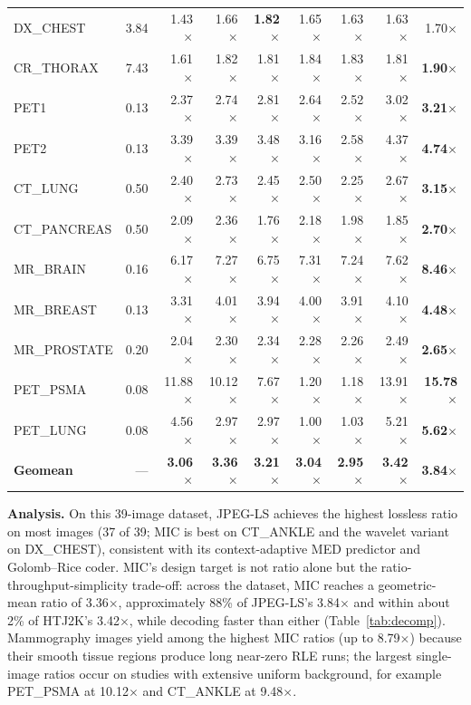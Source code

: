 \documentclass[journal]{IEEEtran}
\begin{document}
\begin{table}[t]
\begin{tabular}{lrrrrrrrr}
DX\_CHEST      & 3.84 & 1.43$\times$ & 1.66$\times$ & \textbf{1.82$\times$} & 1.65$\times$ & 1.63$\times$ & 1.63$\times$ & 1.70$\times$ \\
CR\_THORAX     & 7.43 & 1.61$\times$ & 1.82$\times$ & 1.81$\times$ & 1.84$\times$ & 1.83$\times$ & 1.81$\times$ & \textbf{1.90$\times$} \\
PET1           & 0.13 & 2.37$\times$ & 2.74$\times$ & 2.81$\times$ & 2.64$\times$ & 2.52$\times$ & 3.02$\times$ & \textbf{3.21$\times$} \\
PET2           & 0.13 & 3.39$\times$ & 3.39$\times$ & 3.48$\times$ & 3.16$\times$ & 2.58$\times$ & 4.37$\times$ & \textbf{4.74$\times$} \\
CT\_LUNG       & 0.50 & 2.40$\times$ & 2.73$\times$ & 2.45$\times$ & 2.50$\times$ & 2.25$\times$ & 2.67$\times$ & \textbf{3.15$\times$} \\
CT\_PANCREAS   & 0.50 & 2.09$\times$ & 2.36$\times$ & 1.76$\times$ & 2.18$\times$ & 1.98$\times$ & 1.85$\times$ & \textbf{2.70$\times$} \\
MR\_BRAIN      & 0.16 & 6.17$\times$ & 7.27$\times$ & 6.75$\times$ & 7.31$\times$ & 7.24$\times$ & 7.62$\times$ & \textbf{8.46$\times$} \\
MR\_BREAST     & 0.13 & 3.31$\times$ & 4.01$\times$ & 3.94$\times$ & 4.00$\times$ & 3.91$\times$ & 4.10$\times$ & \textbf{4.48$\times$} \\
MR\_PROSTATE   & 0.20 & 2.04$\times$ & 2.30$\times$ & 2.34$\times$ & 2.28$\times$ & 2.26$\times$ & 2.49$\times$ & \textbf{2.65$\times$} \\
PET\_PSMA      & 0.08 & 11.88$\times$ & 10.12$\times$ & 7.67$\times$ & 1.20$\times$ & 1.18$\times$ & 13.91$\times$ & \textbf{15.78$\times$} \\
PET\_LUNG      & 0.08 & 4.56$\times$ & 2.97$\times$ & 2.97$\times$ & 1.00$\times$ & 1.03$\times$ & 5.21$\times$ & \textbf{5.62$\times$} \\
\midrule
\textbf{Geomean} & --- & \textbf{3.06$\times$} & \textbf{3.36$\times$} & \textbf{3.21$\times$} & \textbf{3.04$\times$} & \textbf{2.95$\times$} & \textbf{3.42$\times$} & \textbf{3.84$\times$} \\
\bottomrule
\end{tabular}
\end{table}


\textbf{Analysis.} On this 39-image dataset, JPEG-LS achieves the highest
lossless ratio on most images (37 of 39; MIC is best on CT\_ANKLE and the
wavelet variant on DX\_CHEST), consistent with its context-adaptive MED
predictor and Golomb--Rice coder. MIC's design target is not ratio alone
but the ratio-throughput-simplicity trade-off: across the dataset, MIC
reaches a geometric-mean ratio of 3.36$\times$, approximately 88\% of
JPEG-LS's 3.84$\times$ and within about 2\% of HTJ2K's 3.42$\times$,
while decoding faster than either (Table~\ref{tab:decomp}). Mammography
images yield among the highest MIC ratios
(up to 8.79$\times$) because their smooth tissue regions produce long
near-zero RLE runs; the largest single-image ratios occur on studies with
extensive uniform background, for example PET\_PSMA at 10.12$\times$ and
CT\_ANKLE at 9.48$\times$.
\end{document}
